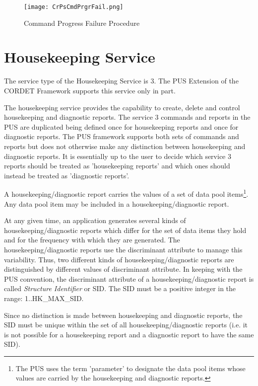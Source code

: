 \documentclass{pnp_article}
\begin{document}
\begin{figure}[H]
 \centering
 \texttt{[image: CrPsCmdPrgrFail.png]}
 \caption{Command Progress Failure Procedure}
 \label{fig:CmdPrgrFail}
\end{figure}

\section{Housekeeping Service}\label{sec:serv3}
The service type of the Housekeeping Service is 3. The PUS Extension of the CORDET Framework supports this service only in part.

The housekeeping service provides the capability to create, delete and control housekeeping and diagnostic reports. The service 3 commands and reports in the PUS are duplicated being defined once for housekeeping reports and once for diagnostic reports. The PUS framework supports both sets of commands and reports but does not otherwise make any distinction between housekeeping and diagnostic reports. It is essentially up to the user to decide which service 3 reports should be treated as 'housekeeping reports' and which ones should instead be treated as 'diagnostic reports'.

A housekeeping/diagnostic report carries the values of a set of data pool items\footnote{The PUS uses the term 'parameter' to designate the data pool items whose values are carried by the housekeeping and diagnostic reports.}. Any data pool item may be included in a housekeeping/diagnostic report. 

At any given time, an application generates several kinds of housekeeping/diagnostic reports which differ for the set of data items they hold and for the frequency with which they are generated. The housekeeping/diagnostic reports use the discriminant attribute to manage this variability. Thus, two different kinds of housekeeping/diagnostic reports are distinguished by different values of discriminant attribute. In keeping with the PUS convention, the discriminant attribute of a housekeeping/diagnostic report is called \textit{Structure Identifier} or SID. The SID must be a positive integer in the range: 1..HK\_MAX\_SID.

Since no distinction is made between housekeeping and diagnostic reports, the SID must be unique within the set of all housekeeping/diagnostic reports (i.e. it is not possible for a housekeeping report and a diagnostic report to have the same SID).
\end{document}
